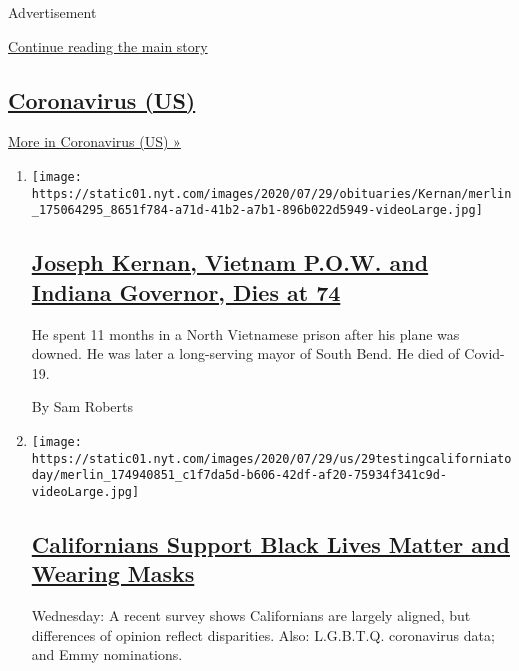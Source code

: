 Advertisement

\protect\hyperlink{after-mid1}{Continue reading the main story}

\hypertarget{coronavirus-us}{%
\subsection{\texorpdfstring{\href{/spotlight/coronavirus}{Coronavirus
(US)}}{Coronavirus (US)}}\label{coronavirus-us}}

\href{/spotlight/coronavirus}{More in Coronavirus (US) »}

\begin{enumerate}
\def\labelenumi{\arabic{enumi}.}
\item
  \texttt{[image: https://static01.nyt.com/images/2020/07/29/obituaries/Kernan/merlin\_175064295\_8651f784-a71d-41b2-a7b1-896b022d5949-videoLarge.jpg]}

  \hypertarget{joseph-kernan-vietnam-pow-and-indiana-governor-dies-at-74}{%
  \subsection{\texorpdfstring{\href{/2020/07/29/us/politics/joseph-kernan-dead-coronavirus.html}{Joseph
  Kernan, Vietnam P.O.W. and Indiana Governor, Dies at
  74}}{Joseph Kernan, Vietnam P.O.W. and Indiana Governor, Dies at 74}}\label{joseph-kernan-vietnam-pow-and-indiana-governor-dies-at-74}}

  He spent 11 months in a North Vietnamese prison after his plane was
  downed. He was later a long-serving mayor of South Bend. He died of
  Covid-19.

  By Sam Roberts
\item
  \texttt{[image: https://static01.nyt.com/images/2020/07/29/us/29testingcaliforniatoday/merlin\_174940851\_c1f7da5d-b606-42df-af20-75934f341c9d-videoLarge.jpg]}

  \hypertarget{californians-support-black-lives-matter-and-wearing-masks}{%
  \subsection{\texorpdfstring{\href{/2020/07/29/us/california-coronavirus-demographics.html}{Californians
  Support Black Lives Matter and Wearing
  Masks}}{Californians Support Black Lives Matter and Wearing Masks}}\label{californians-support-black-lives-matter-and-wearing-masks}}

  Wednesday: A recent survey shows Californians are largely aligned, but
  differences of opinion reflect disparities. Also: L.G.B.T.Q.
  coronavirus data; and Emmy nominations.


\end{enumerate}

